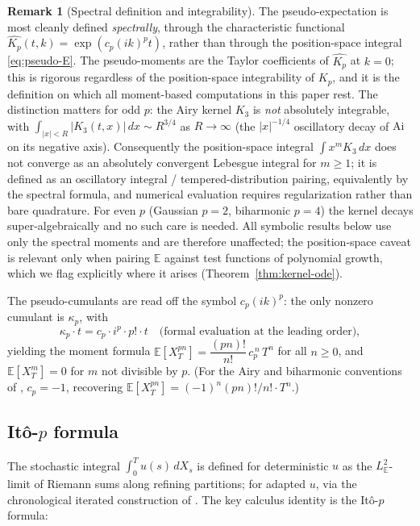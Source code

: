 \documentclass[11pt,reqno]{amsart}
\theoremstyle{plain}
\theoremstyle{definition}
\newtheorem{remark}[theorem]{Remark}
\newcommand{\E}{\mathbb{E}}
\begin{document}
\begin{remark}[Spectral definition and integrability]
\label{rem:spectral}
The pseudo-expectation is most cleanly defined \emph{spectrally}, through the characteristic functional $\widehat{K_p}(t,k) = \exp(c_p (ik)^p t)$, rather than through the position-space integral \eqref{eq:pseudo-E}. The pseudo-moments are the Taylor coefficients of $\widehat{K_p}$ at $k=0$; this is rigorous regardless of the position-space integrability of $K_p$, and it is the definition on which all moment-based computations in this paper rest. The distinction matters for odd $p$: the Airy kernel $K_3$ is \emph{not} absolutely integrable, with $\int_{|x|<R}|K_3(t,x)|\,dx \sim R^{3/4}$ as $R\to\infty$ (the $|x|^{-1/4}$ oscillatory decay of $\mathrm{Ai}$ on its negative axis). Consequently the position-space integral $\int x^m K_3\, dx$ does not converge as an absolutely convergent Lebesgue integral for $m \geq 1$; it is defined as an oscillatory integral / tempered-distribution pairing, equivalently by the spectral formula, and numerical evaluation requires regularization rather than bare quadrature. For even $p$ (Gaussian $p=2$, biharmonic $p=4 $) the kernel decays super-algebraically and no such care is needed. All symbolic results below use only the spectral moments and are therefore unaffected; the position-space caveat is relevant only when pairing $\E$ against test functions of polynomial growth, which we flag explicitly where it arises (Theorem~\ref{thm:kernel-ode}).
\end{remark}

The pseudo-cumulants are read off the symbol $c_p (ik)^p$: the only nonzero cumulant is $\kappa_p$, with
\begin{equation}
\kappa_p \cdot t = c_p \cdot i^p \cdot p! \cdot t \quad\text{(formal evaluation at the leading order)},
\end{equation}
yielding the moment formula $\E[X_T^{pn}] = \dfrac{(pn)!}{n!}\, c_p^{\,n}\, T^n$ for all $n \geq 0$, and $\E[X_T^m] = 0$ for $m$ not divisible by $p$. (For the Airy and biharmonic conventions of \cite{operatorDerivativeII}, $c_p = -1$, recovering $\E[X_T^{pn}] = (-1)^n (pn)!/n! \cdot T^n$.)

\subsection{Itô-$p$ formula}

The stochastic integral $\int_0^T u(s)\, dX_s$ is defined for deterministic $u$ as the $L^2_\E$-limit of Riemann sums along refining partitions; for adapted $u$, via the chronological iterated construction of \cite{operatorDerivativeII, NishiokaBiharmonic, LachalAiry}. The key calculus identity is the Itô-$p$ formula:
\end{document}
